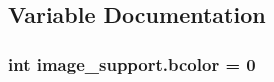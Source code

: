 \subsection{Variable Documentation}
\hypertarget{namespaceimage__support_a1cfece0a81077dca0136b23884fb318d}{}
\subsubsection[{bcolor}]{\setlength{\rightskip}{0pt plus 5cm}int image\+\_\+support.\+bcolor = 0}\label{namespaceimage__support_a1cfece0a81077dca0136b23884fb318d}
